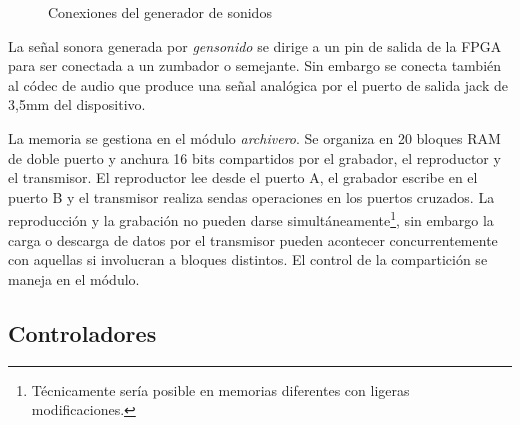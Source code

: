 \documentclass{article}
\begin{document}
\begin{figure}[ht]\centering

	\caption{Conexiones del generador de sonidos}
	\label{fig:gensonido}
\end{figure}

	\medskip La señal sonora generada por {\itshape gensonido} se dirige a un pin de salida de la FPGA para ser conectada a un zumbador o semejante. Sin embargo se conecta también al códec de audio que produce una señal analógica por el puerto de salida jack de 3,5mm del dispositivo.

	\medskip La memoria se gestiona en el módulo {\itshape archivero}. Se organiza en 20 bloques RAM de doble puerto y anchura 16 bits compartidos por el grabador, el reproductor y el transmisor. El reproductor lee desde el puerto A, el grabador escribe en el puerto B y el transmisor realiza sendas operaciones en los puertos cruzados. La reproducción y la grabación no pueden darse simultáneamente\footnote{Técnicamente sería posible en memorias diferentes con ligeras modificaciones.}, sin embargo la carga o descarga de datos por el transmisor pueden acontecer concurrentemente con aquellas si involucran a bloques distintos. El control de la compartición se maneja en el módulo.

\subsection{Controladores}
\end{document}
